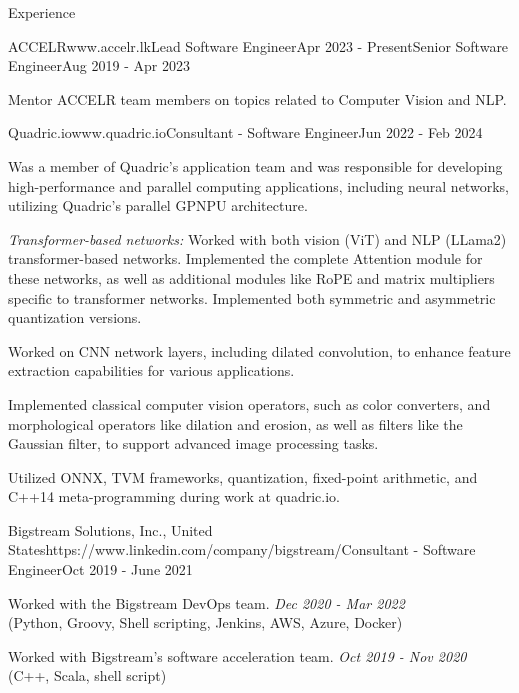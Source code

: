 \documentclass[
	11pt, %
]{./assets/resume} %
\begin{document}
\begin{rSection}{Experience}
    \begin{rSubsectionM}{ACCELR}{www.accelr.lk}{Lead Software Engineer}{Apr 2023 - Present}{Senior Software Engineer}{Aug 2019 - Apr 2023}{}{}
        \item Mentor ACCELR team members on topics related to Computer Vision and NLP.
	\end{rSubsectionM}

    \begin{rSubsectionX}{Quadric.io}{www.quadric.io}{Consultant - Software Engineer}{Jun 2022 - Feb 2024}
        \item Was a member of Quadric's application team and was responsible for developing high-performance and parallel computing applications, including neural networks, utilizing Quadric's parallel GPNPU architecture.
        \item \textit{Transformer-based networks:} Worked with both vision (ViT) and NLP (LLama2) transformer-based networks. Implemented the complete Attention module for these networks, as well as additional modules like RoPE and matrix multipliers specific to transformer networks. Implemented both symmetric and asymmetric quantization versions.
        \item Worked on CNN network layers, including dilated convolution, to enhance feature extraction capabilities for various applications.
        \item Implemented classical computer vision operators, such as color converters, and morphological operators like dilation and erosion, as well as filters like the Gaussian filter, to support advanced image processing tasks.
        \item Utilized ONNX, TVM frameworks, quantization, fixed-point arithmetic, and C++14 meta-programming during work at quadric.io.
    \end{rSubsectionX}

    \begin{rSubsectionX}{Bigstream Solutions, Inc., United States}{https://www.linkedin.com/company/bigstream/}{Consultant - Software Engineer}{Oct 2019 - June 2021}
        \item Worked with the Bigstream DevOps team. \hfill {\textit{Dec 2020 - Mar 2022}} \\(Python, Groovy, Shell scripting, Jenkins, AWS, Azure, Docker)
        \item Worked with Bigstream's software acceleration team. \hfill {\textit{Oct 2019 - Nov 2020}} \\(C++, Scala, shell script)
    \end{rSubsectionX}


\end{rSection}
\end{document}
